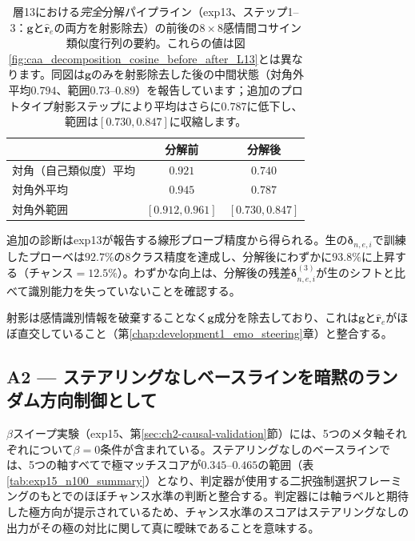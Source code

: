 \begin{table}[H]
\centering
\small
\begin{tabular}{lcc}
\toprule
 & \textbf{分解前} & \textbf{分解後} \\
\midrule
対角（自己類似度）平均 & $0.921$ & $0.740$ \\
対角外平均               & $0.945$ & $0.787$ \\
対角外範囲              & $[0.912, 0.961]$ & $[0.730, 0.847]$ \\
\bottomrule
\end{tabular}
\caption{層13における\emph{完全}分解パイプライン（exp13、ステップ1--3：$\mathbf{g}$と$\hat{\mathbf{r}}_e$の両方を射影除去）の前後の$8\times8$感情間コサイン類似度行列の要約。これらの値は図\ref{fig:caa_decomposition_cosine_before_after_L13}とは異なります。同図は$\mathbf{g}$のみを射影除去した後の中間状態（対角外平均$0.794$、範囲$0.73$--$0.89$）を報告しています；追加のプロトタイプ射影ステップにより平均はさらに$0.787$に低下し、範囲は$[0.730, 0.847]$に収縮します。}
\label{tab:exp13_cosine_comparison}
\end{table}

追加の診断はexp13が報告する線形プローブ精度から得られる。生の$\boldsymbol{\delta}_{n,e,i}$で訓練したプローベは$92.7\%$の8クラス精度を達成し、分解後にわずかに$93.8\%$に上昇する（チャンス$= 12.5\%$）。わずかな向上は、分解後の残差$\boldsymbol{\delta}^{(3)}_{n,e,i}$が生のシフトと比べて識別能力を失っていないことを確認する。\par

射影は感情識別情報を破棄することなく$\mathbf{g}$成分を除去しており、これは$\mathbf{g}$と$\hat{\mathbf{r}}_e$がほぼ直交していること（第\ref{chap:development1_emo_steering}章）と整合する。

\subsection*{A2 --- ステアリングなしベースラインを暗黙のランダム方向制御として}

$\beta$スイープ実験（exp15、第\ref{sec:ch2-causal-validation}節）には、5つのメタ軸それぞれについて$\beta=0$条件が含まれている。ステアリングなしのベースラインでは、5つの軸すべてで極マッチスコアが$0.345$--$0.465$の範囲（表\ref{tab:exp15_n100_summary}）となり、判定器が使用する二択強制選択フレーミングのもとでのほぼチャンス水準の判断と整合する。判定器には軸ラベルと期待した極方向が提示されているため、チャンス水準のスコアはステアリングなしの出力がその極の対比に関して真に曖昧であることを意味する。

